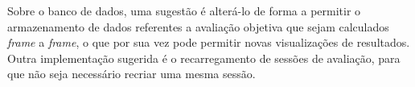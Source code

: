 Sobre o banco de dados, uma sugestão é alterá-lo de forma a permitir o armazenamento de dados referentes a avaliação objetiva que sejam calculados \emph{frame} a \emph{frame}, o que por sua vez pode permitir novas visualizações de resultados. Outra  implementação sugerida é o recarregamento de sessões de avaliação, para que não seja necessário recriar uma mesma sessão.


